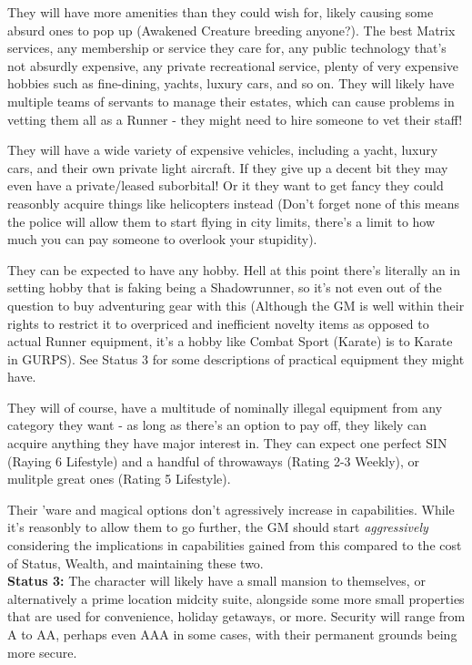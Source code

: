 \begin{multicols*}{2}
	They will have more amenities than they could wish for, likely causing some absurd ones to pop up (Awakened Creature breeding anyone?). The best Matrix services, any membership or service they care for, any public technology that's not absurdly expensive, any private recreational service, plenty of very expensive hobbies such as fine-dining, yachts, luxury cars, and so on. They will likely have multiple teams of servants to manage their estates, which can cause problems in vetting them all as a Runner - they might need to hire someone to vet their staff! 
	
	They will have a wide variety of expensive vehicles, including a yacht, luxury cars, and their own private light aircraft. If they give up a decent bit they may even have a private/leased suborbital! Or it they want to get fancy they could reasonbly acquire things like helicopters instead (Don't forget none of this means the police will allow them to start flying in city limits, there's a limit to how much you can pay someone to overlook your stupidity).
	
	They can be expected to have any hobby. Hell at this point there's literally an in setting hobby that is faking being a Shadowrunner, so it's not even out of the question to buy adventuring gear with this (Although the GM is well within their rights to restrict it to overpriced and inefficient novelty items as opposed to actual Runner equipment, it's a hobby like Combat Sport (Karate) is to Karate in GURPS). See Status 3 for some descriptions of practical equipment they might have. 
	
	They will of course, have a multitude of nominally illegal equipment from any category they want - as long as there's an option to pay off, they likely can acquire anything they have major interest in. They can expect one perfect SIN (Raying 6 Lifestyle) and a handful of throwaways (Rating 2-3 Weekly), or mulitple great ones (Rating 5 Lifestyle).
	
	Their 'ware and magical options don't agressively increase in capabilities. While it's reasonbly to allow them to go further, the GM should start \textit{aggressively} considering the implications in capabilities gained from this compared to the cost of Status, Wealth, and maintaining these two.\\
	
	\textbf{Status 3:} The character will likely have a small mansion to themselves, or alternatively a prime location midcity suite, alongside some more small properties that are used for convenience, holiday getaways, or more. Security will range from A to AA, perhaps even AAA in some cases, with their permanent grounds being more secure.
	

\end{multicols*}
